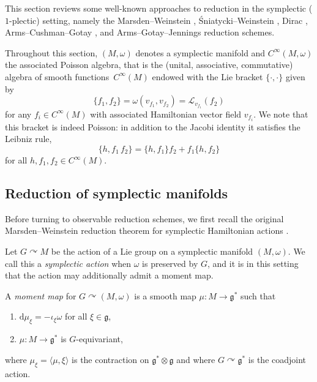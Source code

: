\documentclass[pdftex]{sigma}
\numberwithin{equation}{section}
\DeclareMathOperator{\action}{\curvearrowright}
\newcommand{\g}{\mathfrak{g}}
\renewcommand{\L}{\mathscr{L}}
\renewcommand{\d}{\mathrm{d}}
\begin{document}
This section reviews some well-known approaches to reduction in the symplectic ($1$-plectic) setting, namely the Marsden--Weinstein \cite{MarsdenWeinstein74},  \'Sniatycki--Weinstein \cite{SniatyckiWeinstein83}, Dirac \cite{Dirac64}, Arms--Cush\-man--Gotay \cite{ArmsCushmanGotay91}, and Arms--Gotay--Jennings \cite{ArmsGotayJennings90} reduction schemes.


Throughout this section, $(M,\omega)$ denotes a symplectic manifold and $C^\infty(M,\omega)$ the associated Poisson algebra, that is the (unital, associative, commutative) algebra of smooth func\-tions~$C^\infty(M)$ endowed with the Lie bracket $\{\cdot,\cdot\}$ given by
\[
	\{f_1,f_2\} = \omega( v_{f_1}, v_{f_2})
	= \L_{ v_{f_1}} (f_2)
\]
for any $f_i\in C^\infty(M)$ with associated Hamiltonian vector field $v_{f_i}$.
We note that this bracket is indeed Poisson: in addition to the Jacobi identity it satisfies the Leibniz rule,
\[
	\{h, f_1\,f_2 \} = \{h,f_1\}f_2 + f_1\{h,f_2\}
\]
for all $h,f_1,f_2 \in C^\infty(M)$.


\subsection{Reduction of symplectic manifolds}%

Before turning to observable reduction schemes, we first recall the original Marsden--Weinstein reduction theorem for symplectic Hamiltonian actions \cite{MarsdenWeinstein74}.

Let $G\action M$ be the action of a Lie group on a symplectic manifold $(M,\omega)$. We call this a \emph{symplectic action} when $\omega$ is preserved by $G$,
and it is in this setting that the action may additionally admit a moment map.


\begin{Definition}\label{def:momentmap}
	A \emph{moment map} for $G\action(M,\omega)$ is a smooth map $\mu\colon M\to \mathfrak{g}^\ast$ such that
		\begin{enumerate}\itemsep=0pt
			\item[(i)] $\d\mu_\xi= -\iota_\xi\omega$ for all $\xi\in\g$,
			\item[(ii)] $\mu\colon M\to\g^*$ is $G$-equivariant,
		\end{enumerate}
		where $\mu_\xi=\langle\mu,\xi\rangle$ is the contraction on $\g^*\otimes\g$ and where $G\curvearrowright\g^*$ is the coadjoint action.
\end{Definition}
\end{document}
